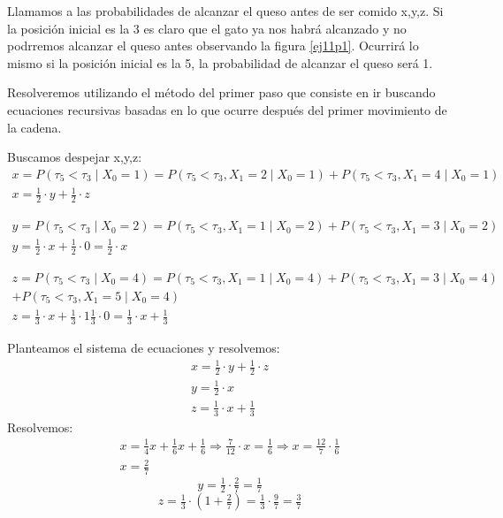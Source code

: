 Llamamos a las probabilidades de alcanzar el queso antes de ser comido x,y,z. Si la posición inicial es la 3 es claro que el gato ya nos habrá alcanzado y no podrremos alcanzar el queso antes observando la figura \ref{ej11p1}.
Ocurrirá lo mismo si la posición inicial es la 5, la probabilidad de alcanzar el queso será 1.

Resolveremos utilizando el método del primer paso que consiste en ir buscando ecuaciones recursivas basadas en lo que ocurre después del primer movimiento de la cadena.

Buscamos despejar x,y,z:
\[
\begin{matrix}
    x= P(\tau_5 < \tau_3 \mid X_0=1) = P(\tau_5 < \tau_3 , X_1=2 \mid X_0=1) + P(\tau_5 < \tau_3 , X_1=4 \mid X_0=1) \\
    x= \tfrac12 \cdot y + \tfrac12 \cdot z
\end{matrix}
\]

\[
\begin{matrix}
    y=P(\tau_5 < \tau_3 \mid X_0=2) = P(\tau_5 < \tau_3, X_1=1 \mid X_0=2)+P(\tau_5 < \tau_3, X_1=3 \mid X_0=2) \\
    y = \tfrac12 \cdot x + \tfrac12 \cdot 0 = \tfrac12 \cdot x
\end{matrix}
\]

\[
\begin{matrix}
    z=P(\tau_5 < \tau_3 \mid X_0=4) = P(\tau_5 < \tau_3, X_1=1 \mid X_0=4) + P(\tau_5 < \tau_3, X_1=3 \mid X_0=4)\\ + P(\tau_5 < \tau_3, X_1=5 \mid X_0=4) \\
    z= \tfrac13 \cdot x + \tfrac13 \cdot 1 \tfrac13 \cdot 0 = \tfrac13 \cdot x + \tfrac13 
\end{matrix}
\]

Planteamos el sistema de ecuaciones y resolvemos:
\[
\begin{matrix}
    x = \tfrac12 \cdot y + \tfrac12 \cdot z \\
    y = \tfrac12 \cdot x \\
    z= \tfrac13 \cdot x + \tfrac13 
\end{matrix}
\]
Resolvemos:
\[
\begin{matrix}
    x = \tfrac14 x + \tfrac16 x +\tfrac16 \Longrightarrow \frac{7}{12} \cdot x = \tfrac16 \Longrightarrow x = \frac{12}{7} \cdot \tfrac16 \\
    x = \tfrac27
\end{matrix}
\]
\medskip
\[
    y= \tfrac12 \cdot\tfrac27 = \tfrac17
\]
\medskip
\[
z=\tfrac13 \cdot \left(1 + \tfrac27\right) = \tfrac13 \cdot \tfrac97 = \tfrac37
\]    


